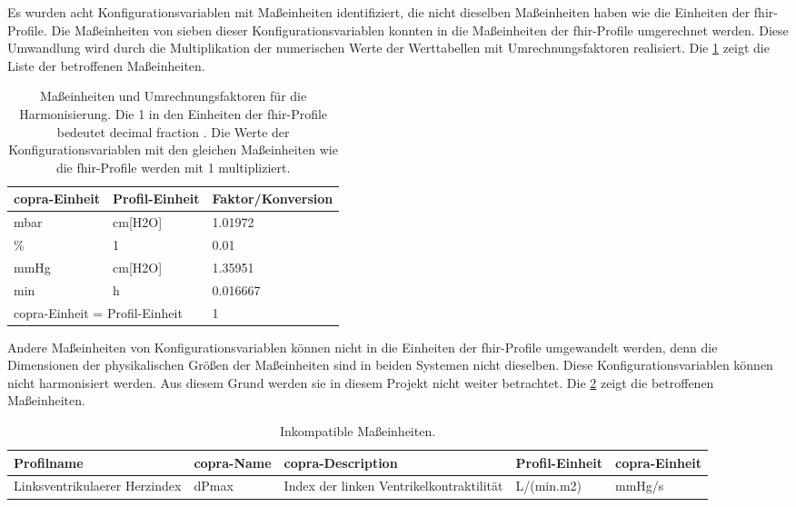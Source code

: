 Es wurden acht Konfigurationsvariablen mit Maßeinheiten identifiziert, die nicht dieselben Maßeinheiten haben wie die Einheiten der \ac{fhir}-Profile. Die Maßeinheiten von sieben dieser Konfigurationsvariablen konnten in die Maßeinheiten der \ac{fhir}-Profile umgerechnet werden. Diese Umwandlung wird durch die Multiplikation der numerischen Werte der Werttabellen mit Umrechnungsfaktoren realisiert. Die \ref{tab:unittoconvert} zeigt die Liste der betroffenen Maßeinheiten.  

\begin{table}[ht]
	\centering
	\caption[Maßeinheiten und Umrechnungsfaktoren für die Harmonisierung]{Maßeinheiten und Umrechnungsfaktoren für die Harmonisierung. Die 1 in den Einheiten der \ac{fhir}-Profile bedeutet \glqq decimal fraction\grqq{} \cite{unitsloinc}. Die Werte der Konfigurationsvariablen mit den gleichen Maßeinheiten wie die \ac{fhir}-Profile werden mit 1 multipliziert.}
	\label{tab:unittoconvert}
	\begin{tabular}{|l|l|l|} \hline
		\bfseries \ac{copra}-Einheit & \bfseries Profil-Einheit & \bfseries Faktor/Konversion \\ \hline
		mbar & cm[H2O] & 1.01972 \\ \hline
		\% & 1 & 0.01 \\ \hline
		mmHg & cm[H2O] & 1.35951 \\ \hline
		min & h & 0.016667 \\ \hline
		\multicolumn{2}{|l|}{\ac{copra}-Einheit = Profil-Einheit} & 1 \\ \hline
	\end{tabular}
\end{table}

Andere Maßeinheiten von Konfigurationsvariablen können nicht in die Einheiten der \ac{fhir}-Profile umgewandelt werden, denn die Dimensionen der physikalischen Größen der Maßeinheiten sind in beiden Systemen nicht dieselben. Diese Konfigurationsvariablen können nicht harmonisiert werden. Aus diesem Grund werden sie in diesem Projekt nicht weiter betrachtet. Die \ref{tab:unitnocompat} zeigt die betroffenen Maßeinheiten. 

\begin{table}[ht]
	\centering
	\caption[Inkompatible Maßeinheiten]{Inkompatible Maßeinheiten.}
	\label{tab:unitnocompat}
	\begin{tabular}{|p{3.3cm}|p{1.7cm}|p{2.6cm}|p{2cm}|p{1.8cm}|} \hline
		\bfseries Profilname & \bfseries \ac{copra}-Name & \bfseries \ac{copra}-Description & \bfseries Profil-Einheit & \bfseries \ac{copra}-Einheit \\ \hline
		Linksventrikulaerer Herzindex & dPmax & Index der linken Ventrikelkontraktilität & L/(min.m2) & mmHg/s \\ \hline
	\end{tabular}
\end{table}

